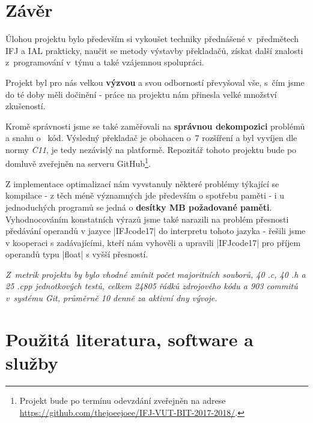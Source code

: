 \section{Závěr}
Úlohou projektu bylo především si vykoušet techniky přednášené v~předmětech IFJ a IAL prakticky,
naučit se metody výstavby překladačů, získat další znalosti z~programování v~týmu a také vzájemnou spolupráci.

Projekt byl pro nás velkou \textbf{výzvou} a svou odborností převyšoval vše, s~čím jsme do té doby měli dočinění - práce na projektu nám přinesla velké množství zkušeností.

Kromě správnosti jsme se také zaměřovali na \textbf{správnou dekompozici} problémů a snahu o~ kód. Výsledný překladač je obohacen o~7 rozšíření a byl vyvíjen dle normy \emph{C11}, je tedy nezávislý na platformě. Repozitář tohoto projektu bude po domluvě zveřejněn na serveru GitHub\footnote{Projekt bude po termínu odevzdání zveřejněn na adrese \href{https://github.com/thejoeejoee/IFJ-VUT-BIT-2017-2018/}{https://github.com/thejoeejoee/IFJ-VUT-BIT-2017-2018/}.}.

Z implementace optimalizací nám vyvstanuly některé problémy týkající se kompilace - z těch méně významných jde především o spotřebu paměti - i u jednoduchých programů se jedná o \textbf{desítky MB požadované paměti}. Vyhodnocováním konstatních výrazů jsme také narazili na problém přesnosti předávání operandů v jazyce \ic|IFJcode17| do interpretu tohoto jazyka - řešili jsme v kooperaci s zadávajícími, kteří nám vyhověli a upravili \ic|IFJcode17| pro příjem operandů typu \ic|float| s vyšší přesností.

\emph{
	Z~metrik projektu by bylo vhodné zmínit počet majoritních souborů, 40 .c, 40 .h a 25 .cpp jednotkových testů, celkem \emph{24805} řádků zdrojového kódu a \emph{903} commitů v~systému \emph{Git}, průměrně \emph{10} denně za aktivní dny vývoje.
}

\vfill
\section{Použitá literatura, software a služby}

